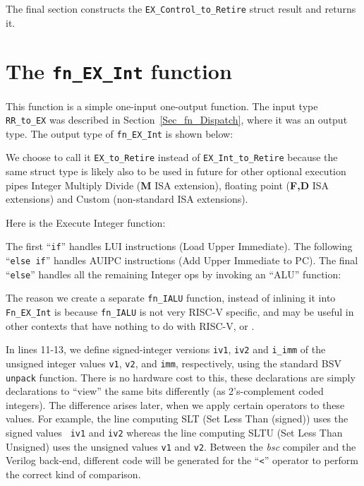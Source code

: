 The final section constructs the \verb|EX_Control_to_Retire| struct
result and returns it.




\section{The {\tt fn\_EX\_Int} function}

\label{Sec_fn_EX_Int}


This function is a simple one-input one-output function.  The input
type \verb|RR_to_EX| was described in Section~\ref{Sec_fn_Dispatch},
where it was an output type.  The output type of \verb|fn_EX_Int| is
shown below:


We choose to call it \verb|EX_to_Retire| instead of
\verb|EX_Int_to_Retire| because the same struct type is likely also to
be used in future for other optional execution pipes Integer Multiply
Divide ({\bf M} ISA extension), floating point ({\bf F,D} ISA
extensions) and Custom (non-standard ISA extensions).

Here is the Execute Integer function:


The first ``\verb|if|'' handles LUI instructions (Load Upper
Immediate).  The following ``\verb|else if|'' handles AUIPC
instructions (Add Upper Immediate to PC). The final ``\verb|else|''
handles all the remaining Integer ops by invoking an ``ALU'' function:


The reason we create a separate \verb|fn_IALU| function, instead of
inlining it into \verb|Fn_EX_Int| is because \verb|fn_IALU| is not
very RISC-V specific, and may be useful in other contexts that have
nothing to do with RISC-V, {\DRUM} or {\FIFE}.

In lines 11-13, we define signed-integer versions {\tt iv1}, {\tt iv2}
and \verb|i_imm| of the unsigned integer values {\tt v1}, {\tt v2},
and {\tt imm}, respectively, using the standard BSV \verb|unpack|
function.  There is no hardware cost to this, these declarations are
simply declarations to ``view'' the same bits differently (as
2's-complement coded integers).  The difference arises later, when we
apply certain operators to these values.  For example, the line
computing SLT (Set Less Than (signed)) uses the signed values {\tt
iv1} and {\tt iv2} whereas the line computing SLTU (Set Less Than
Unsigned) uses the unsigned values {\tt v1} and {\tt v2}.  Between the
\emph{bsc} compiler and the Verilog back-end, different code will be
generated for the ``{\tt <}'' operator to perform the correct kind of
comparison.

